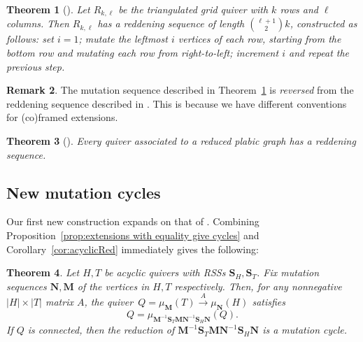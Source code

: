 \documentclass[11pt, letterpaper]{amsart}
\newcommand{\cS}[1]{{\noindent\textsf{\color{purple}$\blacksquare$~#1~$\blacksquare$}}}
\newtheorem{theorem}{Theorem}[section]
\theoremstyle{definition}
\newtheorem{remark}[theorem]{Remark}
\numberwithin{equation}{section}
\begin{document}
\begin{theorem}[{\cite[Proposition~11.16]{MR3452273}}]
\label{thm:grid reddening}
Let $R_{k, \ell}$ be the triangulated grid quiver with $k$ rows and $\ell$ columns.
Then $R_{k, \ell}$ has a reddening sequence of length $\binom {\ell+1} 2 k$, constructed as follows:
set $i=1$;
mutate the leftmost $i$ vertices of each row, starting from the bottom row and mutating each row from right-to-left;
increment $i$ and repeat the previous step.
\end{theorem}

\begin{remark}
    The mutation sequence described in Theorem~\ref{thm:grid reddening} is \emph{reversed} from the reddening sequence described in \cite[Section~11]{MR3452273}. 
    This is because we have different conventions for (co)framed extensions.
\end{remark}

\begin{theorem}[{\cite[Theorem~1.2]{MR3820364}}]
\label{thm:reduced plabics redd}
Every quiver associated to a reduced plabic graph has a reddening sequence.
\end{theorem}

\subsection{New mutation cycles}

Our first new construction expands on that of \cite[Theorem~1.1]{LMC}. Combining Proposition~\ref{prop:extensions with equality give cycles} and Corollary~\ref{cor:acyclicRed} immediately gives the following:

\begin{theorem}%
\label{thm:LMCGeneral}
    Let $H,T$ be acyclic quivers with RSSs $\mathbf S_H,\mathbf S_T$. 
    Fix mutation sequences $\mathbf N, \mathbf M$ of the vertices in $H, T$ respectively. 
    Then, for any nonnegative $|H|\times |T|$ matrix $A$, the quiver~${Q = \mu_{\mathbf M}(T) \stackrel{A}\rightarrow \mu_{\mathbf N}(H)}$ satisfies $${Q = \mu_{\mathbf M^{-1}\mathbf S_T \mathbf M \mathbf N^{-1} \mathbf S_H \mathbf N}(Q).}$$
    If $Q$ is connected, then the reduction of $\mathbf M^{-1}\mathbf S_T \mathbf M \mathbf N^{-1} \mathbf S_H \mathbf N$ is a mutation cycle.
\end{theorem}
\end{document}
